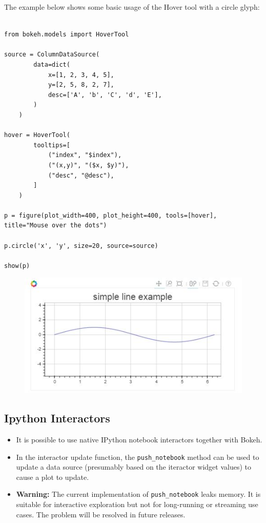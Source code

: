 \documentclass[a4paper,12pt]{article}
\begin{document}
The example below shows some basic usage of the Hover tool with a circle glyph:

\begin{framed}
\begin{verbatim}

from bokeh.models import HoverTool

source = ColumnDataSource(
        data=dict(
            x=[1, 2, 3, 4, 5],
            y=[2, 5, 8, 2, 7],
            desc=['A', 'b', 'C', 'd', 'E'],
        )
    )

hover = HoverTool(
        tooltips=[
            ("index", "$index"),
            ("(x,y)", "($x, $y)"),
            ("desc", "@desc"),
        ]
    )

p = figure(plot_width=400, plot_height=400, tools=[hover], title="Mouse over the dots")

p.circle('x', 'y', size=20, source=source)

show(p)

\end{verbatim}
\end{framed}

\begin{figure}
\centering
\includegraphics[width=0.7\linewidth]{images/06-interactions-tut-05}
\caption{}
\label{fig:06-interactions-tut-05}
\end{figure}
\subsection{Ipython Interactors}
\begin{itemize}
\item It is possible to use native IPython notebook interactors together with Bokeh. 
\item In the interactor update function, the \texttt{push\_notebook} method can be used to update a data source (presumably based on the iteractor widget values) to cause a plot to update.

\item \textbf{Warning:} The current implementation of \texttt{push\_notebook} leaks memory. It is suitable for interactive exploration but not for long-running or streaming use cases. The problem will be resolved in future releases.
\end{itemize}
\end{document}
